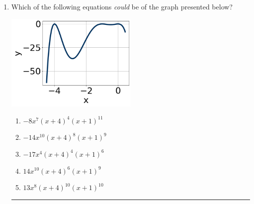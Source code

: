\documentclass[14pt]{extbook}
\newcommand{\litem}[1]{\item#1\hspace*{-1cm}\rule{\textwidth}{0.4pt}}
\begin{document}
\begin{enumerate}
{\begin{enumerate}[label=\Alph*.]
\end{enumerate} }
\litem{
Which of the following equations \textit{could} be of the graph presented below?
\begin{center}
    \includegraphics[width=0.5\textwidth]{../Figures/polyGraphToFunctionCopyA.png}
\end{center}
\begin{enumerate}[label=\Alph*.]
\item \( -8x^{7} (x + 4)^{4} (x + 1)^{11} \)
\item \( -14x^{10} (x + 4)^{8} (x + 1)^{9} \)
\item \( -17x^{4} (x + 4)^{4} (x + 1)^{6} \)
\item \( 14x^{10} (x + 4)^{6} (x + 1)^{9} \)
\item \( 13x^{8} (x + 4)^{10} (x + 1)^{10} \)


\end{enumerate}}
\end{enumerate}
\end{document}
